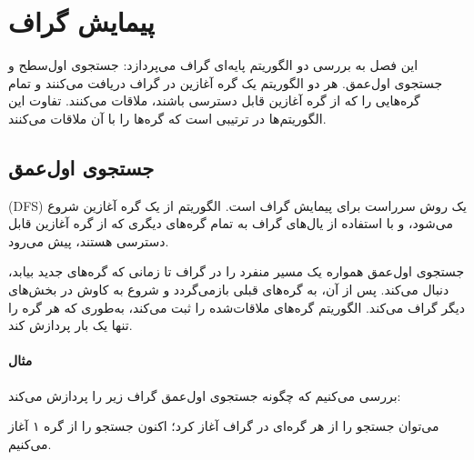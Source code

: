 \chapter{پیمایش گراف}

این فصل به بررسی دو الگوریتم پایه‌ای گراف می‌پردازد:
جستجوی اول‌سطح و جستجوی اول‌عمق.
هر دو الگوریتم یک گره آغازین در گراف دریافت می‌کنند
و تمام گره‌هایی را که از گره آغازین قابل دسترسی باشند،
ملاقات می‌کنند.
تفاوت این الگوریتم‌ها در ترتیبی است
که گره‌ها را با آن ملاقات می‌کنند.

\section{جستجوی اول‌عمق}


 (DFS)
یک روش سرراست برای پیمایش گراف است.
الگوریتم از یک گره آغازین شروع می‌شود،
و با استفاده از یال‌های گراف
به تمام گره‌های دیگری که از گره آغازین قابل دسترسی هستند، پیش می‌رود.

جستجوی اول‌عمق همواره یک مسیر منفرد را در گراف
تا زمانی که گره‌های جدید بیابد، دنبال می‌کند.
پس از آن، به گره‌های قبلی بازمی‌گردد
و شروع به کاوش در بخش‌های دیگر گراف می‌کند.
الگوریتم گره‌های ملاقات‌شده را ثبت می‌کند،
به‌طوری که هر گره را تنها یک بار پردازش کند.

\subsubsection*{مثال}

بررسی می‌کنیم که چگونه جستجوی اول‌عمق
گراف زیر را پردازش می‌کند:
\begin{center}
\end{center}
می‌توان جستجو را از هر گره‌ای در گراف آغاز کرد؛
اکنون جستجو را از گره ۱ آغاز می‌کنیم.

